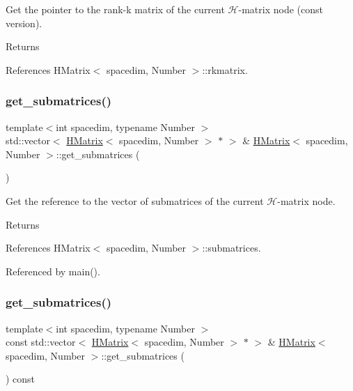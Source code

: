 Get the pointer to the rank-\/k matrix of the current $\mathcal{H}$-\/matrix node (const version). \begin{DoxyReturn}{Returns}

\end{DoxyReturn}


References H\+Matrix$<$ spacedim, Number $>$\+::rkmatrix.

\mbox{\label{classHMatrix_a0572b2c0484ce618db0034e3bc7988ed}} 
\subsubsection{\texorpdfstring{get\+\_\+submatrices()}{get\_submatrices()}\hspace{0.1cm}{\footnotesize\ttfamily [1/2]}}
{\footnotesize\ttfamily template$<$int spacedim, typename Number $>$ \\
std\+::vector$<$ \hyperlink{classHMatrix}{H\+Matrix}$<$ spacedim, Number $>$ $\ast$ $>$ \& \hyperlink{classHMatrix}{H\+Matrix}$<$ spacedim, Number $>$\+::get\+\_\+submatrices (\begin{DoxyParamCaption}{ }\end{DoxyParamCaption})}

Get the reference to the vector of submatrices of the current $\mathcal{H}$-\/matrix node. \begin{DoxyReturn}{Returns}

\end{DoxyReturn}


References H\+Matrix$<$ spacedim, Number $>$\+::submatrices.



Referenced by main().

\mbox{\label{classHMatrix_a8f8e9bc437ab86296d78950081ea34cd}} 
\subsubsection{\texorpdfstring{get\+\_\+submatrices()}{get\_submatrices()}\hspace{0.1cm}{\footnotesize\ttfamily [2/2]}}
{\footnotesize\ttfamily template$<$int spacedim, typename Number $>$ \\
const std\+::vector$<$ \hyperlink{classHMatrix}{H\+Matrix}$<$ spacedim, Number $>$ $\ast$ $>$ \& \hyperlink{classHMatrix}{H\+Matrix}$<$ spacedim, Number $>$\+::get\+\_\+submatrices (\begin{DoxyParamCaption}{ }\end{DoxyParamCaption}) const}

